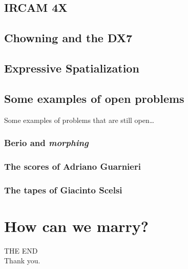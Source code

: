 \documentclass[\printmode,compress]{beamer}
\begin{document}
\subsection[4X]{IRCAM 4X}



\subsection[DX7]{Chowning and the DX7}



\subsection[Spatialization]{Expressive Spatialization}



\subsection[Open Problems]{Some examples of open problems}

\begin{frame}
  \begin{center}
    {\large\alert{Some examples of problems that are still open\ldots}}
  \end{center}
\end{frame}

\subsubsection[Morphing]{Berio and {\it morphing}}



\subsubsection[Guarnieri]{The scores of Adriano Guarnieri}



\subsubsection[Scelsi]{The tapes of Giacinto Scelsi}



\section[How]{How can we marry?}



\begin{frame}
    \begin{center}
				{\Huge \alert{THE END}}\\[2\baselineskip]
				\alert{Thank you.}
    \end{center}
\end{frame}
\end{document}
